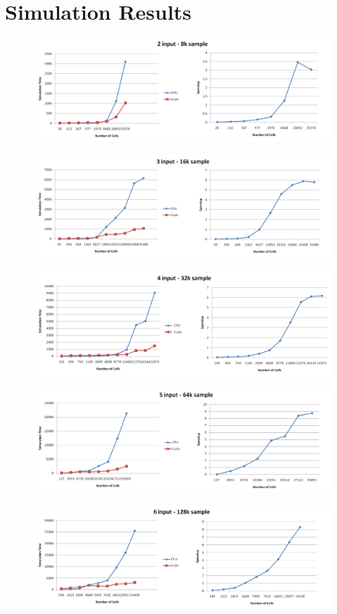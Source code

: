 \chapter{Simulation Results}\label{sec:sim_res}
\begin{figure}
\centering
\includegraphics[scale=0.3]{img/compleate1.png}
\end{figure}

\begin{figure}
\centering
\includegraphics[scale=0.3]{img/compleate2.png}
\end{figure}

\begin{figure}
\centering
\includegraphics[scale=0.3]{img/compleate3.png}
\end{figure}

\begin{figure}
\centering
\includegraphics[scale=0.3]{img/compleate4.png}
\end{figure}

\begin{figure}
\centering
\includegraphics[scale=0.3]{img/compleate5.png}
\end{figure}
